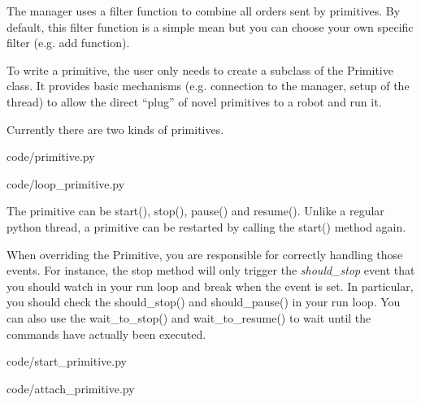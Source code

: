The manager uses a filter function to combine all orders sent by primitives. By default, this filter function is a simple mean but you can choose your own specific filter (e.g. add function).

To write a primitive, the user only needs to create a subclass of the Primitive class. It provides basic mechanisms (e.g. connection to the manager, setup of the thread) to allow the direct “plug” of novel primitives to a robot and run it.

Currently there are two kinds of primitives.



    {code/primitive.py}


    {code/loop_primitive.py}

The primitive can be start(), stop(), pause() and resume(). Unlike a regular python thread, a primitive can be restarted by calling the start() method again.

When overriding the Primitive, you are responsible for correctly handling those events. For instance, the stop method will only trigger the \emph{should\_stop} event that you should watch in your run loop and break when the event is set. In particular, you should check the should\_stop() and should\_pause() in your run loop. You can also use the wait\_to\_stop() and wait\_to\_resume() to wait until the commands have actually been executed.



    {code/start_primitive.py}


    {code/attach_primitive.py}

